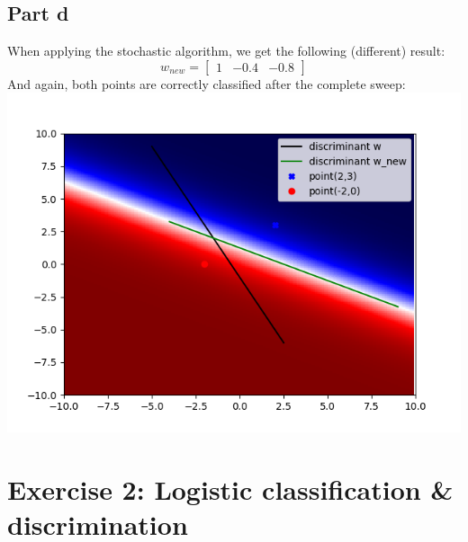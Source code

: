 \documentclass[a4paper, 10pt]{article}
\begin{document}
\subsection{Part d} 
When applying the stochastic algorithm, we get the following (different) result: 
$$ 
w_{new} = \begin{bmatrix}1 & -0.4 & -0.8\end{bmatrix} 
$$ 
And again, both points are correctly classified after the complete sweep: 
\\ 
\includegraphics[scale=0.6]{ex1_d.png} 
\section{Exercise 2: Logistic classification \& discrimination}
\end{document}

